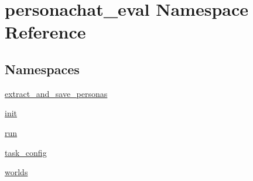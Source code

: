 \hypertarget{namespacepersonachat__eval}{}\section{personachat\+\_\+eval Namespace Reference}
\label{namespacepersonachat__eval}
\subsection*{Namespaces}
\begin{DoxyCompactItemize}
\item 
 \hyperlink{namespacepersonachat__eval_1_1extract__and__save__personas}{extract\+\_\+and\+\_\+save\+\_\+personas}
\item 
 \hyperlink{namespacepersonachat__eval_1_1init}{init}
\item 
 \hyperlink{namespacepersonachat__eval_1_1run}{run}
\item 
 \hyperlink{namespacepersonachat__eval_1_1task__config}{task\+\_\+config}
\item 
 \hyperlink{namespacepersonachat__eval_1_1worlds}{worlds}
\end{DoxyCompactItemize}
